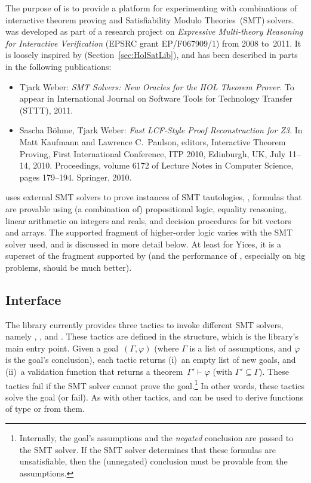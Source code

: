 
\setcounter{sessioncount}{0}

The purpose of  is to provide a platform for
experimenting with combinations of interactive theorem proving and
Satisfiability Modulo Theories~(SMT) solvers.   was
developed as part of a research project on {\it Expressive
  Multi-theory Reasoning for Interactive Verification} (EPSRC grant
EP/F067909/1) from 2008 to~2011.  It is loosely inspired by
 (Section~\ref{sec:HolSatLib}), and has been described
in parts in the following publications:
\begin{itemize}
\item Tjark Weber: {\it SMT Solvers: New Oracles for the HOL Theorem
  Prover}.  To appear in International Journal on Software Tools for
  Technology Transfer (STTT), 2011.
\item Sascha B{\"o}hme, Tjark Weber: {\it Fast LCF-Style Proof
  Reconstruction for Z3}.  In Matt Kaufmann and Lawrence C.\ Paulson,
  editors, Interactive Theorem Proving, First International
  Conference, ITP 2010, Edinburgh, UK, July 11--14, 2010.
  Proceedings, volume 6172 of Lecture Notes in Computer Science, pages
  179--194.  Springer, 2010.
\end{itemize}
 uses external SMT solvers to prove instances of SMT
tautologies, \ie, formulas that are provable using (a combination of)
propositional logic, equality reasoning, linear arithmetic on integers
and reals, and decision procedures for bit vectors and arrays.  The
supported fragment of higher-order logic varies with the SMT solver
used, and is discussed in more detail below.  At least for Yices, it
is a superset of the fragment supported by  (and
the performance of , especially on big problems, should
be much better).

\subsection{Interface}

The library currently provides three tactics to invoke different SMT
solvers, namely , , and
.  These tactics are defined in the 
structure, which is the library's main entry point.  Given a
goal~$(\Gamma, \varphi)$ (where $\Gamma$ is a list of assumptions, and
$\varphi$ is the goal's conclusion), each tactic returns (i)~an empty
list of new goals, and (ii)~a validation function that returns a
theorem~$\Gamma' \vdash \varphi$ (with $\Gamma' \subseteq \Gamma$).
These tactics fail if the SMT solver cannot prove the
goal.\footnote{Internally, the goal's assumptions and the
  \emph{negated} conclusion are passed to the SMT solver.  If the SMT
  solver determines that these formulas are unsatisfiable, then the
  (unnegated) conclusion must be provable from the assumptions.}  In
other words, these tactics solve the goal (or fail).  As with other
tactics,  and  can be used
to derive functions of type  or  from
them.

